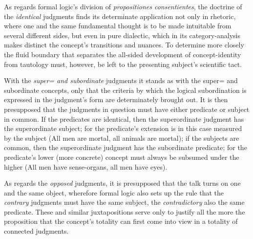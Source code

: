 \documentclass[12pt]{book}
\begin{document}
As regards formal logic's division of \textit{propositiones consentientes},
the doctrine of the \emph{identical} judgments finds its determinate
application not only in rhetoric, where one and the same fundamental thought
is to be made intuitable from several different sides, but even in pure
dialectic, which in its category-analysis makes distinct the concept's
transitions and nuances. To determine more closely the fluid boundary that
separates the all-sided development of concept-identity from tautology
must, however, be left to the presenting subject's scientific tact.

With the \emph{super= and subordinate} judgments it stands as with the
super= and subordinate concepts, only that the criteria by which the logical
subordination is expressed in the judgment's form are determinately brought
out. It is then presupposed that the judgments in question must have either
predicate or subject in common. If the predicates are identical, then the
superordinate judgment has the superordinate subject; for the predicate's
extension is in this case measured by the subject (All men are mortal, all
animals are mortal); if the subjects are common, then the superordinate
judgment has the subordinate predicate; for the predicate's lower (more
concrete) concept must always be subsumed under the higher (All men have
sense-organs, all men have eyes).

As regards the \emph{opposed} judgments, it is presupposed that the talk
turns on one and the same object, wherefore formal logic also sets up the
rule that the \emph{contrary} judgments must have the same subject, the
\emph{contradictory} also the same predicate. These and similar
juxtapositions serve only to justify all the more the proposition that the
concept's totality can first come into view in a totality of connected
judgments.
\end{document}
